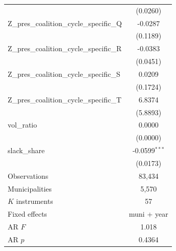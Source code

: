 \begin{tabular}{lc}
 & (0.0260) \\
Z\_pres\_coalition\_cycle\_specific\_Q & -0.0287 \\
 & (0.1189) \\
Z\_pres\_coalition\_cycle\_specific\_R & -0.0383 \\
 & (0.0451) \\
Z\_pres\_coalition\_cycle\_specific\_S & 0.0209 \\
 & (0.1724) \\
Z\_pres\_coalition\_cycle\_specific\_T & 6.8374 \\
 & (5.8893) \\
vol\_ratio & 0.0000 \\
 & (0.0000) \\
slack\_share & -0.0599$^{***}$ \\
 & (0.0173) \\
\midrule
Observations & 83,434 \\
Municipalities & 5,570 \\
$K$ instruments & 57 \\
Fixed effects & muni + year \\
AR $F$ & 1.018 \\
AR $p$ & 0.4364 \\
\bottomrule
\end{tabular}
